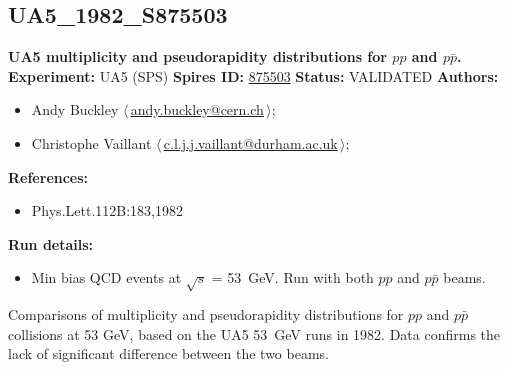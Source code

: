 \subsection[UA5\_1982\_S875503]{UA5\_1982\_S875503\,\cite{Alpgard:1982zx}}
\textbf{UA5 multiplicity and pseudorapidity distributions for $pp$ and $p\bar{p}$.}\newline
\textbf{Experiment:} UA5 (SPS) \newline
\textbf{Spires ID:} \href{http://www.slac.stanford.edu/spires/find/hep/www?rawcmd=key+875503}{875503}\newline
\textbf{Status:} VALIDATED\newline
\textbf{Authors:}
\begin{itemize}
  \item Andy Buckley $\langle\,$\href{mailto:andy.buckley@cern.ch}{andy.buckley@cern.ch}$\,\rangle$;
  \item Christophe Vaillant $\langle\,$\href{mailto:c.l.j.j.vaillant@durham.ac.uk}{c.l.j.j.vaillant@durham.ac.uk}$\,\rangle$;
\end{itemize}
\textbf{References:}
\begin{itemize}
  \item Phys.Lett.112B:183,1982
\end{itemize}
\textbf{Run details:}
\begin{itemize}

  \item Min bias QCD events at \ensuremath{\sqrt{s}} = 53~GeV. Run with both $pp$ and $p\bar{p}$ beams.\end{itemize}

\noindent Comparisons of multiplicity and pseudorapidity distributions for $pp$ and  $p\bar{p}$ collisions at 53 GeV, based on the UA5 53~GeV runs in 1982. Data confirms the lack of significant difference between the two beams.

\clearpage


\clearpage

